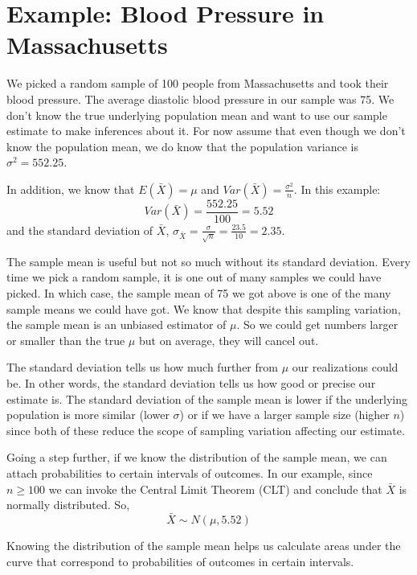 \documentclass{./../../Latex/handout}
\begin{document}
\thispagestyle{plain}

\vspace{-1cm}
\section*{Example: Blood Pressure in Massachusetts}

We picked a random sample of 100 people from Massachusetts and took their blood pressure. The average diastolic blood pressure in our sample was 75. We don't know the true underlying population mean and want to use our sample estimate to make inferences about it. For now assume that even though we don't know the population mean, we do know that the population variance is $\sigma^2 = 552.25$. 

In addition, we know that $E(\bar{X}) = \mu$ and $Var(\bar{X}) = \frac{\sigma^2}{n}$. In this example: 
$$ Var(\bar{X}) = \frac{552.25}{100} = 5.52 $$ 
and the standard deviation of $\bar{X}$, $ \sigma_{\bar{X}} = \frac{\sigma}{\sqrt{n}} = \frac{23.5}{10} = 2.35$. 

The sample mean is useful but not so much without its standard deviation. Every time we pick a random sample, it is one out of many samples we could have picked. In which case, the sample mean of 75 we got above is one of the many sample means we could have got. We know that despite this sampling variation, the sample mean is an unbiased estimator of $\mu$. So we could get numbers larger or smaller than the true $\mu$ but on average, they will cancel out. 

The standard deviation tells us how much further from $\mu$ our realizations could be. In other words, the standard deviation tells us how good or precise our estimate is. The standard deviation of the sample mean is lower if the underlying population is more similar (lower $\sigma$) or if we have a larger sample size (higher $n$) since both of these reduce the scope of sampling variation affecting our estimate. 

Going a step further, if we know the distribution of the sample mean, we can attach probabilities to certain intervals of outcomes. In our example, since $n\geq 100$ we can invoke the Central Limit Theorem (CLT) and conclude that $\bar{X}$ is normally distributed. So, 
$$ \bar{X} \sim N(\mu, 5.52) $$

Knowing the distribution of the sample mean helps us calculate areas under the curve that correspond to probabilities of outcomes in certain intervals.  
\end{document}
